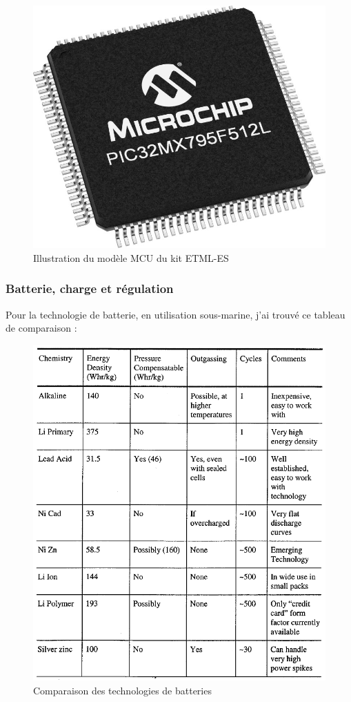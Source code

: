 {{    \begin{figure}[h] 
        \centering
        \includegraphics[width=.4\textwidth]{Figures/PIC32MX795F512L-V7X-Regular}
        \caption{Illustration du modèle MCU du kit ETML-ES}
        \label{fig:MCU}
    \end{figure}
    
}

\clearpage

\subsubsection{Batterie, charge et régulation}
{

Pour la technologie de batterie, en utilisation sous-marine, j'ai trouvé ce tableau de comparaison :

\begin{figure}[h]
    \centering
    \includegraphics[width=.56\textwidth]{Figures/PowerSystemsComparison}
    \caption{Comparaison des technologies de batteries}
    \label{fig:BatteriesComparaisons}
\end{figure}

}}
